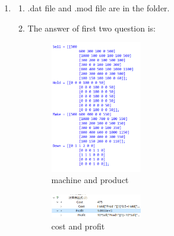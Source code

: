 \documentclass[12pt,a4paper]{article}
\makeatletter
\newtheorem*{solution}{Solution}
\theoremstyle{definition}
\renewenvironment{solution}[1][Solution] {\par\pushQED{\qed}\normalfont\topsep6\p@\@plus6\p@\relax\trivlist\item[\hskip\labelsep\bfseries#1\@addpunct{.}]\ignorespaces}{\popQED\endtrivlist\@endpefalse} \makeatother
\makeatother
\begin{document}
\begin{enumerate}
    \begin{solution}
      \begin{enumerate}
        \item .dat file and .mod file are in the folder.
        \item The answer of first two question is:
        \begin{figure}[htbp]
          \centering
          \includegraphics[width=0.4\textwidth]{machine and product.pdf}
          \caption{machine and product}\label{machine and product}
        \end{figure}
        
        \begin{figure}[htbp]
          \centering
          \includegraphics[width=0.4\textwidth]{cost and profit.pdf}
          \caption{cost and profit}\label{cost and profit}
        \end{figure}
      \end{enumerate}
    \end{solution}

\end{enumerate}
\newpage
\vspace{20pt}
\end{document}
